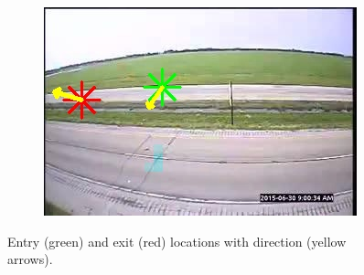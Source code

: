 \begin{figure}
\begin{subfigure}{0.32\linewidth}
        \end{subfigure}
        \begin{subfigure}{0.32\linewidth}
            \includegraphics[width=\linewidth]{./img/scene_learning/res/245837/245837-5.jpg}
        \end{subfigure}
        \caption{Entry (green) and exit (red) locations with direction (yellow arrows).}
        \label{fig:entry-exit-app-2}
\end{figure}
